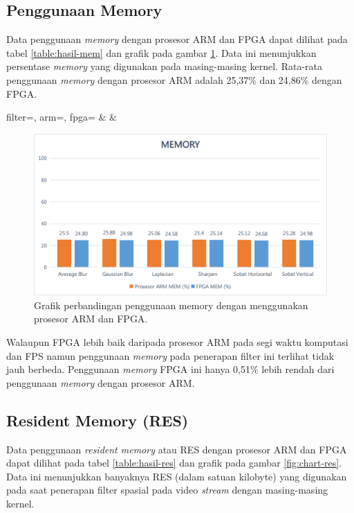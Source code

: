 \subsection{Penggunaan Memory}
Data penggunaan \textit{memory} dengan prosesor ARM dan FPGA dapat dilihat pada tabel \ref{table:hasil-mem} dan grafik pada gambar \ref{fig:chart-mem}. Data ini menunjukkan persentase \textit{memory} yang digunakan pada masing-masing kernel. Rata-rata penggunaan \textit{memory} dengan prosesor ARM adalah 25,37\% dan 24,86\% dengan FPGA. 
\begin{atable}
    \caption{Tabel perbandingan penggunaan memory dengan menggunakan prosesor ARM dan FPGA.}
    \label{table:hasil-mem}
        {
            filter=\filter, 
            arm=\arm, 
            fpga=\fpga}
        {
            \filter & 
            \arm & 
            \fpga }
\end{atable}
\begin{figure}[H]
    \includegraphics[width=0.81\linewidth, center]{images/chart/chart-mem.png}
    \caption{Grafik perbandingan penggunaan memory dengan menggunakan prosesor ARM dan FPGA.}
    \label{fig:chart-mem}
\end{figure}
Walaupun FPGA lebih baik daripada prosesor ARM pada segi waktu komputasi dan FPS namun penggunaan \textit{memory} pada penerapan filter ini terlihat tidak jauh berbeda. Penggunaan \textit{memory} FPGA ini hanya 0,51\% lebih rendah dari penggunaan \textit{memory} dengan prosesor ARM.


\subsection{Resident Memory (RES)}
Data penggunaan \textit{resident memory} atau RES dengan prosesor ARM dan FPGA dapat dilihat pada tabel \ref{table:hasil-res} dan grafik pada gambar \ref{fig:chart-res}. Data ini menunjukkan banyaknya RES (dalam satuan kilobyte) yang digunakan pada saat penerapan filter spasial pada video \textit{stream} dengan masing-masing kernel.


